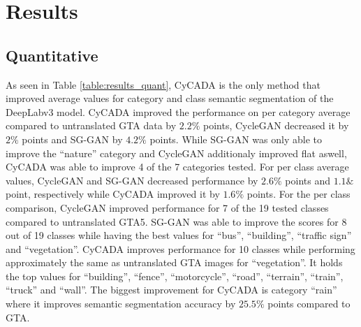 \section{Results}

\subsection{Quantitative}
As seen in Table \ref{table:results_quant}, CyCADA is the only method that improved average values for category and class semantic segmentation of the DeepLabv3 model. CyCADA improved the performance on per category average compared to untranslated GTA data by $2.2\%$ points, CycleGAN decreased it by $2\%$ points and SG-GAN by $4.2\%$ points. While SG-GAN was only able to improve the ``nature'' category and CycleGAN additionaly improved flat aswell, CyCADA was able to improve 4 of the 7 categories tested. For per class average values, CycleGAN and SG-GAN decreased performance by $2.6\%$ points and $1.1\&$ point, respectively while CyCADA improved it by $1.6\%$ points. For the per class comparison, CycleGAN improved performance for 7 of the 19 tested classes compared to untranslated GTA5. SG-GAN was able to improve the scores for 8 out of 19 classes while having the best values for ``bus'', ``building'', ``traffic sign'' and ``vegetation''. CyCADA improves performance for 10 classes while performing approximately the same as untranslated GTA images for ``vegetation''. It holds the top values for ``building'', ``fence'', ``motorcycle'', ``road'', ``terrain'', ``train'', ``truck'' and ``wall''. The biggest improvement for CyCADA is category ``rain'' where it improves semantic segmentation accuracy by $25.5\%$ points compared to GTA.

